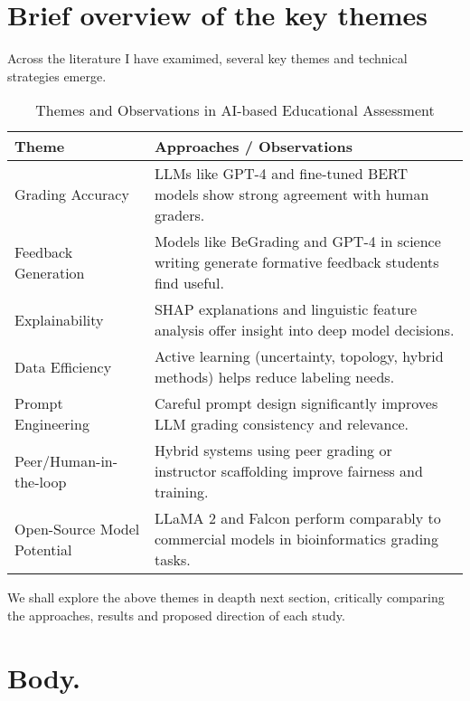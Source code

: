 \documentclass[a4paper,twoside,12pt]{report}
\begin{document}
\section{Brief overview of the key themes}
Across the literature I have examimed, several key themes and technical strategies emerge.

\begin{table}[h!]
  \centering
  \begin{tabular}{|p{5cm}|p{12cm}|}
  \hline
  \textbf{Theme} & \textbf{Approaches / Observations} \\
  \hline
  Grading Accuracy & LLMs like GPT-4 and fine-tuned BERT models show strong agreement with human graders. \\
  \hline
  Feedback Generation & Models like BeGrading and GPT-4 in science writing generate formative feedback students find useful. \\
  \hline
  Explainability & SHAP explanations and linguistic feature analysis offer insight into deep model decisions. \\
  \hline
  Data Efficiency & Active learning (uncertainty, topology, hybrid methods) helps reduce labeling needs. \\
  \hline
  Prompt Engineering & Careful prompt design significantly improves LLM grading consistency and relevance. \\
  \hline
  Peer/Human-in-the-loop & Hybrid systems using peer grading or instructor scaffolding improve fairness and training. \\
  \hline
  Open-Source Model Potential & LLaMA 2 and Falcon perform comparably to commercial models in bioinformatics grading tasks. \\
  \hline
  \end{tabular}
  \caption{Themes and Observations in AI-based Educational Assessment}
  \label{tab:grading_ai_themes}
  \end{table}
We shall explore the above themes in deapth next section, critically comparing the approaches, results
and proposed direction of each study.

\section{Body.}
\end{document}
